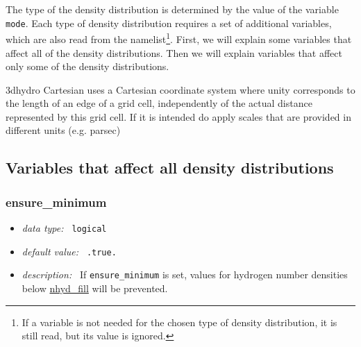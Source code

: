 \documentclass[a4paper,10pt]{article}
\begin{document}
The type of the density distribution is determined by the value
of the variable \texttt{mode}. Each type of density distribution requires a set 
of additional variables, which are also read from the namelist\footnote{If a 
variable is not needed for the chosen type of density distribution, it is still 
read, but its value is ignored.}.  First, we will explain some variables 
that affect all of the density distributions. Then we will explain variables 
that affect only some of the density distributions. 

3dhydro Cartesian uses a Cartesian coordinate system where unity corresponds to 
the length of an edge of a grid cell, independently of the actual distance 
represented by this grid cell. If it is intended do apply scales that are 
provided in different units (e.g. parsec)

\subsection{Variables that affect all density distributions}

\subsubsection{ensure\_minimum}
\label{hydopt:ensureminimum}
\begin{itemize}
 \item \textit{data type:~} \texttt{logical}
 \item \textit{default value:~} \texttt{.true.}
 \item \textit{description:~} If \texttt{ensure\_minimum} is set, values for 
  hydrogen number densities below
  \hyperref[hydopt:nhydfill]{nhyd\_fill} will be prevented.
\end{itemize}
\end{document}
